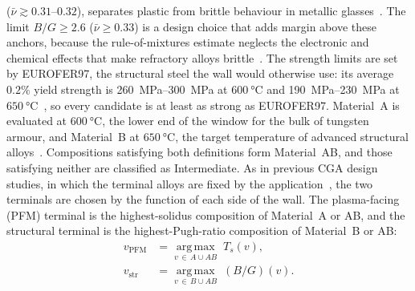 (\(\bar{\nu} \gtrsim 0.31\)--\(0.32\)), separates plastic from brittle behaviour in
metallic glasses~\cite{lewandowski2005intrinsic}. The limit \(B/G \ge 2.6\)
(\(\bar{\nu} \ge 0.33\)) is a design choice that adds margin above these anchors,
because the rule-of-mixtures estimate neglects the electronic and chemical effects
that make refractory alloys
brittle~\cite{singh2023ductility,senkov2021generalization}. The strength limits are
set by EUROFER97, the structural steel the wall would otherwise use: its average
\(0.2\%\) yield strength is \SIrange{260}{300}{\mega\pascal} at
\(\SI{600}{\celsius}\) and \SIrange{190}{230}{\mega\pascal} at
\(\SI{650}{\celsius}\)~\cite{lucon2007overview,gaganidze2018development}, so every
candidate is at least as strong as EUROFER97. Material~A is evaluated at
\(\SI{600}{\celsius}\), the lower end of the window for the bulk of tungsten armour,
and Material~B at \(\SI{650}{\celsius}\), the target temperature of advanced
structural alloys~\cite{stork2014developing,zinkle2017development}. Compositions
satisfying both definitions form Material~AB, and those satisfying neither are
classified as Intermediate. As in previous CGA design studies, in which the terminal alloys are
fixed by the application~\cite{kirk2021monotonic,multiterminalCGA2024}, the two
terminals are chosen by the function of each side of the wall. The plasma-facing
(PFM) terminal is the highest-solidus composition of Material~A or AB, and the
structural terminal is the highest-Pugh-ratio composition of Material~B or AB:
\begin{equation}
\begin{aligned}
v_{\mathrm{PFM}} &= \operatorname*{arg\,max}_{v \,\in\, A \cup AB}\; T_s(v),\\
v_{\mathrm{str}} &= \operatorname*{arg\,max}_{v \,\in\, B \cup AB}\; (B/G)(v).
\end{aligned}
\label{eq:ends}
\end{equation}


